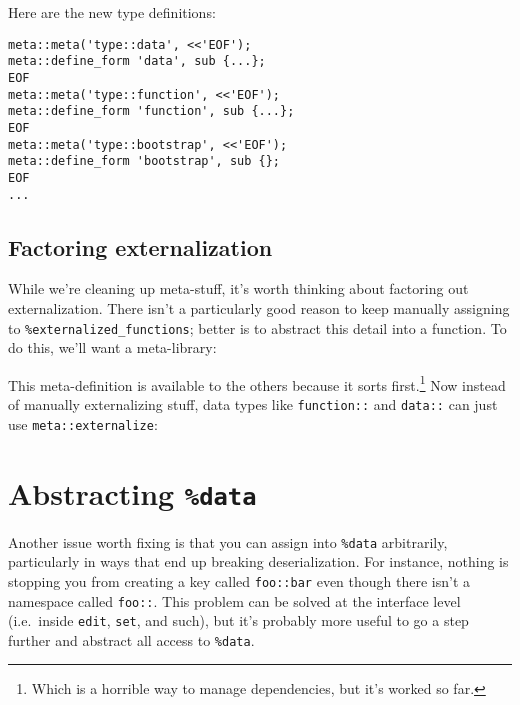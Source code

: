 \documentclass{report}
\begin{document}
    Here are the new type definitions:

\begin{verbatim}
meta::meta('type::data', <<'EOF');
meta::define_form 'data', sub {...};
EOF
meta::meta('type::function', <<'EOF');
meta::define_form 'function', sub {...};
EOF
meta::meta('type::bootstrap', <<'EOF');
meta::define_form 'bootstrap', sub {};
EOF
...
\end{verbatim}

\subsection{Factoring externalization}\label{sec:some-improvements-data-types-factoring-externalization}
      While we're cleaning up meta-stuff, it's worth thinking about factoring out externalization. There isn't a particularly good reason to keep manually assigning to
      \verb|%externalized_functions|; better is to abstract this detail into a function. To do this, we'll want a meta-library:


      This meta-definition is available to the others because it sorts first.\footnote{Which is a horrible way to manage dependencies, but it's worked so far.} Now instead of manually
      externalizing stuff, data types like {\tt function::} and {\tt data::} can just use {\tt meta::externalize}:


\section{Abstracting {\tt \%data}}\label{sec:some-improvements-abstracting-data}
    Another issue worth fixing is that you can assign into \verb|%data| arbitrarily, particularly in ways that end up breaking deserialization. For instance, nothing is stopping you from
    creating a key called {\tt foo::bar} even though there isn't a namespace called {\tt foo::}. This problem can be solved at the interface level (i.e.~inside {\tt edit}, {\tt set}, and
    such), but it's probably more useful to go a step further and abstract all access to \verb|%data|.
\end{document}

